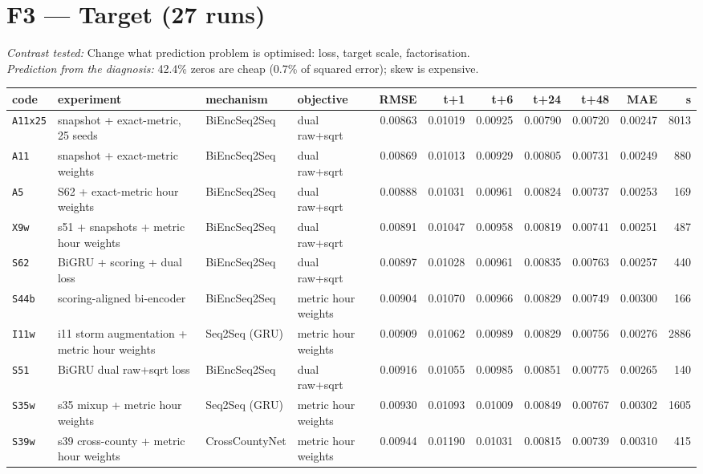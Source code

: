 \documentclass[9pt,landscape]{article}
\begin{document}
\section*{F3 --- Target (27 runs)}
\noindent\emph{Contrast tested:} Change what prediction problem is optimised: loss, target scale, factorisation.\\
\emph{Prediction from the diagnosis:} 42.4\% zeros are cheap (0.7\% of squared error); skew is expensive.
\vspace{2pt}
\begin{longtable}{@{}p{1.1cm}p{5.4cm}p{3.1cm}p{2.7cm}rrrrrrr@{}}
\toprule code & experiment & mechanism & objective & RMSE & t+1 & t+6 & t+24 & t+48 & MAE & s \\ \midrule \endhead
\texttt{A11x25} & snapshot + exact-metric, 25 seeds & BiEncSeq2Seq & dual raw+sqrt & 0.00863 & 0.01019 & 0.00925 & 0.00790 & 0.00720 & 0.00247 & 8013 \\
\texttt{A11} & snapshot + exact-metric weights & BiEncSeq2Seq & dual raw+sqrt & 0.00869 & 0.01013 & 0.00929 & 0.00805 & 0.00731 & 0.00249 & 880 \\
\texttt{A5} & S62 + exact-metric hour weights & BiEncSeq2Seq & dual raw+sqrt & 0.00888 & 0.01031 & 0.00961 & 0.00824 & 0.00737 & 0.00253 & 169 \\
\texttt{X9w} & s51 + snapshots + metric hour weights & BiEncSeq2Seq & dual raw+sqrt & 0.00891 & 0.01047 & 0.00958 & 0.00819 & 0.00741 & 0.00251 & 487 \\
\rowcolor{gray!15}\texttt{S62} & BiGRU + scoring + dual loss & BiEncSeq2Seq & dual raw+sqrt & 0.00897 & 0.01028 & 0.00961 & 0.00835 & 0.00763 & 0.00257 & 440 \\
\texttt{S44b} & scoring-aligned bi-encoder & BiEncSeq2Seq & metric hour weights & 0.00904 & 0.01070 & 0.00966 & 0.00829 & 0.00749 & 0.00300 & 166 \\
\rowcolor{gray!15}\texttt{I11w} & i11 storm augmentation + metric hour weights & Seq2Seq (GRU) & metric hour weights & 0.00909 & 0.01062 & 0.00989 & 0.00829 & 0.00756 & 0.00276 & 2886 \\
\texttt{S51} & BiGRU dual raw+sqrt loss & BiEncSeq2Seq & dual raw+sqrt & 0.00916 & 0.01055 & 0.00985 & 0.00851 & 0.00775 & 0.00265 & 140 \\
\rowcolor{gray!15}\texttt{S35w} & s35 mixup + metric hour weights & Seq2Seq (GRU) & metric hour weights & 0.00930 & 0.01093 & 0.01009 & 0.00849 & 0.00767 & 0.00302 & 1605 \\
\texttt{S39w} & s39 cross-county + metric hour weights & CrossCountyNet & metric hour weights & 0.00944 & 0.01190 & 0.01031 & 0.00815 & 0.00739 & 0.00310 & 415 \\

\end{longtable}
\end{document}
